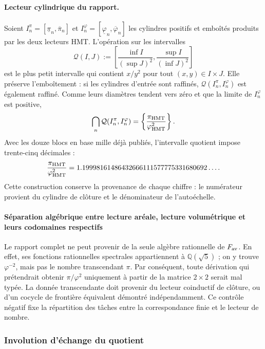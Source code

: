 \paragraph{Lecteur cylindrique du rapport.}
Soient \(I_n^\pi=[\underline\pi_n,\overline\pi_n]\) et
\(I_n^\varphi=[\underline\varphi_n,\overline\varphi_n]\) les cylindres
positifs et emboîtés produits par les deux lecteurs HMT\@. L'opération sur les
intervalles
\[
 \mathcal Q(I,J)
 :=
 \left[
 \frac{\inf I}{(\sup J)^2},
 \frac{\sup I}{(\inf J)^2}
 \right]
\]
est le plus petit intervalle qui contient \(x/y^2\) pour tout
\((x,y)\in I\times J\). Elle préserve l'emboîtement : si les cylindres d'entrée sont
raffinés, \(\mathcal Q(I_n^\pi,I_n^\varphi)\) est également raffiné. Comme leurs
diamètres tendent vers zéro et que la limite de \(I_n^\varphi\) est positive,
\[
 \bigcap_n\mathcal Q(I_n^\pi,I_n^\varphi)
 =
 \left\{\frac{\pi_{\rm HMT}}{\varphi_{\rm HMT}^2}\right\}.
\]
Avec les douze blocs en base mille déjà publiés, l'intervalle quotient impose
trente-cinq décimales :
\[
 \frac{\pi_{\rm HMT}}{\varphi_{\rm HMT}^2}
 =
 1.19998161486432666111577775331680692\ldots.
\]
Cette construction conserve la provenance de chaque chiffre : le numérateur
provient du cylindre de clôture et le dénominateur de l'autoéchelle.

\paragraph{Séparation algébrique entre lecture aréale, lecture volumétrique et leurs codomaines respectifs}
Le rapport complet ne peut provenir de la seule algèbre rationnelle de
\(F_{\rm av}\). En effet, ses fonctions rationnelles spectrales appartiennent à
\(\mathbb Q(\sqrt5)\) ; on y trouve \(\varphi^{-2}\), mais pas le nombre
transcendant \(\pi\). Par conséquent, toute dérivation qui prétendrait
obtenir \(\pi/\varphi^2\) uniquement à partir de la matrice \(2\times2\) serait
mal typée. La donnée transcendante doit provenir du lecteur coinductif de
clôture, ou d'un cocycle de frontière équivalent démontré
indépendamment. Ce contrôle négatif fixe la répartition des tâches entre
la correspondance finie et le lecteur de nombre.

\subsubsection{Involution d'échange du quotient}
\label{p12-83-c16-s2:sec:espejo-pi-phi-electron-hmt}

